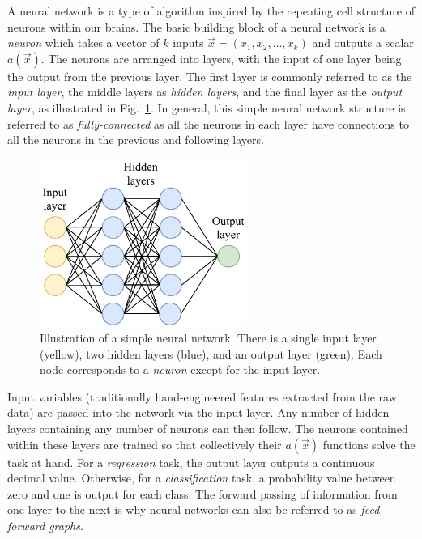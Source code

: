 A neural network is a type of algorithm inspired by the repeating cell structure of neurons within
our brains. The basic building block of a neural network is a \emph{neuron} which takes a vector
of $k$ inputs $\vec{x} = (x_{1}, x_{2},\dots,x_{k})$ and outputs a scalar $a(\vec{x})$. The
neurons are arranged into layers, with the input of one layer being the output from the previous
layer. The first layer is commonly referred to as the \emph{input layer}, the middle layers as
\emph{hidden layers}, and the final layer as the \emph{output layer}, as illustrated in
Fig.~\ref{fig:network}. In general, this simple neural network structure is referred to as
\emph{fully-connected} as all the neurons in each layer have connections to all the neurons in the
previous and following layers.

\begin{figure} %
    \includegraphics[width=0.6\textwidth]{diagrams/6-cvn/network.pdf}
    \caption[Illustration of a simple neural network]
    {Illustration of a simple neural network. There is a single input layer (yellow), two hidden
        layers (blue), and an output layer (green). Each node corresponds to a \emph{neuron}
        except for the input layer.}
    \label{fig:network}
\end{figure}

Input variables (traditionally hand-engineered features extracted from the raw data) are passed
into the network via the input layer. Any number of hidden layers containing any number of neurons
can then follow. The neurons contained within these layers are trained so that collectively their
$a(\vec{x})$ functions solve the task at hand. For a \emph{regression} task, the output layer
outputs a continuous decimal value. Otherwise, for a \emph{classification} task, a probability
value between zero and one is output for each class. The forward passing of information from one
layer to the next is why neural networks can also be referred to as \emph{feed-forward graphs}.

